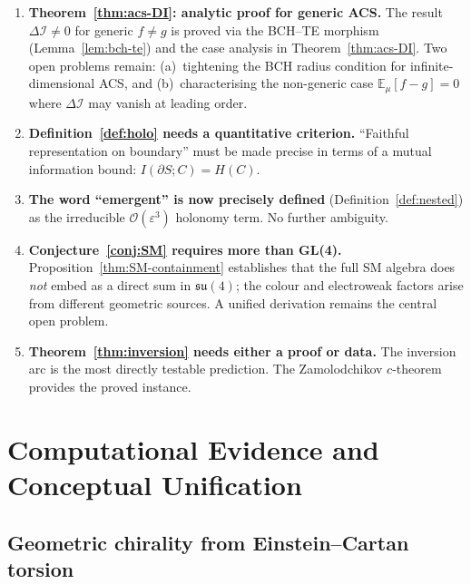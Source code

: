 \documentclass[12pt,a4paper]{article}
\theoremstyle{plain}
\theoremstyle{definition}
\theoremstyle{remark}
\newcommand{\DI}{\Delta\mathcal{I}}
\newcommand{\eps}{\varepsilon}
\newcommand{\Order}[1]{\mathcal{O}(#1)}
\begin{document}
\begin{enumerate}[label=(\arabic*)]
  \item \textbf{Theorem~\ref{thm:acs-DI}: analytic proof for generic ACS.}  
    The result $\DI \neq 0$ for generic $f \neq g$ is proved via the 
    BCH--TE morphism (Lemma~\ref{lem:bch-te}) and the case analysis 
    in Theorem~\ref{thm:acs-DI}.  Two open problems remain: 
    (a)~tightening the BCH radius condition for infinite-dimensional ACS,
    and (b)~characterising the non-generic case $\mathbb{E}_\mu[f-g] = 0$
    where $\DI$ may vanish at leading order.

  \item \textbf{Definition~\ref{def:holo} needs a quantitative criterion.}  
    ``Faithful representation on boundary'' must be made precise in terms 
    of a mutual information bound: $I(\partial S; C) = H(C)$.

  \item \textbf{The word ``emergent'' is now precisely defined} 
    (Definition~\ref{def:nested}) as the irreducible $\Order{\eps^3}$ holonomy 
    term.  No further ambiguity.

  \item \textbf{Conjecture~\ref{conj:SM} requires more than GL(4).}  
    Proposition~\ref{thm:SM-containment} establishes that the full SM algebra 
    does \emph{not} embed as a direct sum in $\mathfrak{su}(4)$; the colour 
    and electroweak factors arise from different geometric sources.  
    A unified derivation remains the central open problem.

  \item \textbf{Theorem~\ref{thm:inversion} needs either a proof or data.}  
    The inversion arc is the most directly testable prediction.  
    The Zamolodchikov $c$-theorem provides the proved instance.
\end{enumerate}


\section{Computational Evidence and Conceptual Unification}
\label{sec:new}

\subsection{Geometric chirality from Einstein--Cartan torsion}
\end{document}
